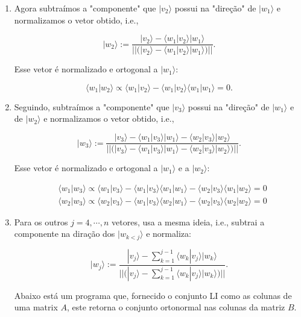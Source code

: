 \documentclass[11pt]{article}
\providecommand{\tightlist}{%
      \setlength{\itemsep}{0pt}\setlength{\parskip}{0pt}}
\begin{document}
\begin{enumerate}
\def\labelenumi{\arabic{enumi}.}
\setcounter{enumi}{1}
\tightlist
\item
  Agora subtraímos a "componente" que \(|v_{2}\rangle\) possui na
  "direção" de \(|w_{1}\rangle\) e normalizamos o vetor obtido, i.e.,

  \begin{equation}
  |w_{2}\rangle := \frac{|v_{2}\rangle-\langle w_{1}|v_{2}\rangle|w_{1}\rangle}{||(|v_{2}\rangle-\langle w_{1}|v_{2}\rangle|w_{1}\rangle)||}.
  \end{equation}

  Esse vetor é normalizado e ortogonal a \(|w_{1}\rangle\):

  \begin{equation}
  \langle w_{1}|w_{2}\rangle \propto \langle w_{1}|v_{2}\rangle-\langle w_{1}|v_{2}\rangle\langle w_{1}|w_{1}\rangle=0.
  \end{equation}
\item
  Seguindo, subtraímos a "componente" que \(|v_{3}\rangle\) possui na
  "direção" de \(|w_{1}\rangle\) e de \(|w_{2}\rangle\) e normalizamos o
  vetor obtido, i.e.,

  \begin{equation}
  |w_{3}\rangle := \frac{|v_{3}\rangle-\langle w_{1}|v_{3}\rangle|w_{1}\rangle-\langle w_{2}|v_{3}\rangle|w_{2}\rangle}{||(|v_{3}\rangle-\langle w_{1}|v_{3}\rangle|w_{1}\rangle-\langle w_{2}|v_{3}\rangle|w_{2}\rangle)||}.
  \end{equation}

  Esse vetor é normalizado e ortogonal a \(|w_{1}\rangle\) e a
  \(|w_{2}\rangle\):

  \begin{align}
  & \langle w_{1}|w_{3}\rangle \propto \langle w_{1}|v_{3}\rangle-\langle w_{1}|v_{3}\rangle\langle w_{1}|w_{1}\rangle-\langle w_{2}|v_{3}\rangle\langle w_{1}|w_{2}\rangle=0 \\
  & \langle w_{2}|w_{3}\rangle \propto \langle w_{2}|v_{3}\rangle-\langle w_{1}|v_{3}\rangle\langle w_{2}|w_{1}\rangle-\langle w_{2}|v_{3}\rangle\langle w_{2}|w_{2}\rangle=0
  \end{align}
\item
  Para os outros \(j=4,\cdots,n\) vetores, usa a mesma ideia, i.e.,
  subtrai a componente na diração dos \(|w_{k<j}\rangle\) e normaliza:

  \begin{equation}
  |w_{j}\rangle := \frac{|v_{j}\rangle-\sum_{k=1}^{j-1}\langle w_{k}|v_{j}\rangle|w_{k}\rangle}{||(|v_{j}\rangle-\sum_{k=1}^{j-1}\langle w_{k}|v_{j}\rangle|w_{k}\rangle)||}.
  \end{equation}

  Abaixo está um programa que, fornecido o conjunto LI como as colunas
  de uma matrix \(A\), este retorna o conjunto ortonormal nas colunas da
  matriz \(B\).
\end{enumerate}
\end{document}
